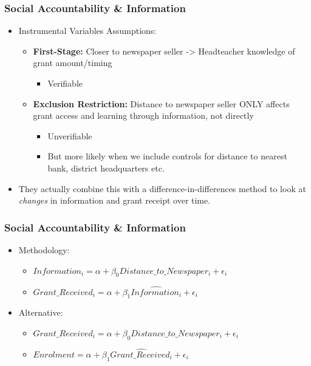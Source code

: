 \documentclass[xcolor=x11names,compress]{beamer}\usepackage[]{graphicx}\usepackage[]{color}
\renewcommand{\(}{\begin{columns}}
\renewcommand{\)}{\end{columns}}
\newcommand{\<}[1]{\begin{column}{#1}}
\renewcommand{\>}{\end{column}}
\begin{document}
\begin{frame}
\frametitle{Social Accountability \& Information}
\begin{itemize}
\item Instrumental Variables Assumptions:
\pause
\begin{itemize}
\item \textbf{First-Stage:} \pause Closer to newspaper seller -> Headteacher knowledge of grant amount/timing
\begin{itemize}
\item Verifiable
\pause
\end{itemize}
\item \textbf{Exclusion Restriction:} \pause Distance to newspaper seller ONLY affects grant access and learning through information, not directly
\begin{itemize}
\item Unverifiable
\item But more likely when we include controls for distance to nearest bank, district headquarters etc.
\end{itemize}
\end{itemize}
\pause
\item They actually combine this with a difference-in-differences method to look at \textit{changes} in information and grant receipt over time.
\end{itemize}
\end{frame}

\begin{frame}
\frametitle{Social Accountability \& Information}
\begin{itemize}
\item Methodology:
\begin{itemize}
\item $Information_i = \alpha + \beta_0 Distance\_to\_Newspaper_i + \epsilon_i$
\item $Grant\_Received_i = \alpha + \beta_1 \hat{Information_i} + \epsilon_i$
\pause
\end{itemize}
\item Alternative:
\begin{itemize}
\item $Grant\_Received_i = \alpha + \beta_0 Distance\_to\_Newspaper_i + \epsilon_i$
\item $Enrolment = \alpha + \beta_1 \hat{Grant\_Received_i} + \epsilon_i$
\end{itemize}
\end{itemize}
\end{frame}
\end{document}
